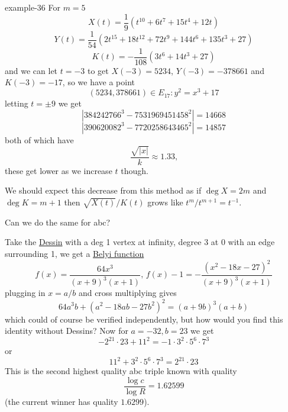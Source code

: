 \documentclass[10pt,]{book}
\numberwithin{equation}{section}
\newcommand{\inv}{^{-1}}
\begin{document}
\begin{example}{}{example-36}%
\hypertarget{p-730}{}%
For \(m =5\)%
\begin{equation*}
X(t) = \frac 19 (t^{10} + 6t^7 +15 t^4 + 12t)
\end{equation*}
%
\begin{equation*}
Y(t) = \frac{1}{54} (2t^{15} + 18t^{12} +72 t^9 + 144 t^6 + 135 t^3 + 27)
\end{equation*}
%
\begin{equation*}
K(t) = -\frac{1}{108} (3t^{6} + 14t^3 +27)
\end{equation*}
and we can let \(t = -3\) to get \(X(-3) = 5234\), \(Y(-3) = -378661\) and \(K(-3) = -17\), so we have a point%
\begin{equation*}
(5234, 378661) \in E_{17} \colon y^2 = x^3 + 17
\end{equation*}
letting \(t = \pm 9\) we get%
\begin{equation*}
|384242766^3 - 7531969451458^2| = 14668
\end{equation*}
%
\begin{equation*}
|390620082^3 - 7720258643465^2| = 14857
\end{equation*}
both of which have%
\begin{equation*}
\frac{\sqrt{|x|}}{k} \approx 1.33\text{,}
\end{equation*}
these get lower as we increase \(t\) though.%
\end{example}
\hypertarget{p-731}{}%
We should expect this decrease from this method as if \(\deg X = 2m\) and \(\deg K = m + 1\) then \(\sqrt{X(t)}/K(t)\) grows like \(t^{m}/t^{m+1} = t\inv\).%
\par
\hypertarget{p-732}{}%
Can we do the same for abc?%
\par
\hypertarget{p-733}{}%
Take the \hyperref[def-dessin-denfant]{Dessin} with a deg 1 vertex at infinity, degree 3 at 0 with an edge surrounding 1, we get a \hyperref[def-belyi-function]{Belyi function}%
\begin{equation*}
f(x) = \frac{64x^3}{(x+9)^3 (x+1)},\,f(x) - 1 = -\frac{(x^2 - 18x -27)^2}{(x+9)^3(x+1)}
\end{equation*}
plugging in \(x=a/b\) and cross multiplying gives%
\begin{equation*}
64a^3 b + (a^2 - 18ab - 27b^2)^2 = (a+9b)^3(a+b)
\end{equation*}
which could of course be verified independently, but how would you find this identity without Dessins? Now for \(a = -32, b= 23\) we get%
\begin{equation*}
- 2^{21} \cdot 23 +  11^2 =  -1 \cdot 3^2 \cdot 5^6 \cdot 7^3
\end{equation*}
or%
\begin{equation*}
11^2 + 3^2 \cdot 5^6 \cdot 7^3 = 2^{21} \cdot 23
\end{equation*}
This is the second highest quality abc triple known with quality%
\begin{equation*}
\frac{\log c}{\log R} = 1.62599
\end{equation*}
(the current winner has quality \(1.6299\)).%
%
%
\typeout{************************************************}
\typeout{************************************************}
%
\end{document}
